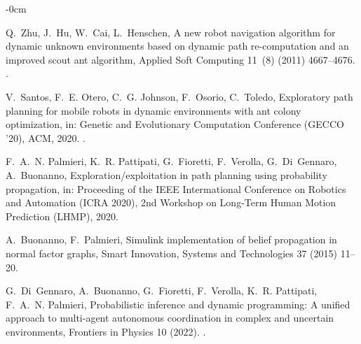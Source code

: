 \documentclass[journal,article,submit,pdftex,moreauthors]{Definitions/mdpi}
\begin{document}
\begin{adjustwidth}{-\extralength}{0cm}
\begin{thebibliography}{10}
	Q.~Zhu, J.~Hu, W.~Cai, L.~Henschen, A new robot navigation algorithm for
	  dynamic unknown environments based on dynamic path re-computation and an
	  improved scout ant algorithm, Applied Soft Computing 11~(8) (2011)
	  4667--4676.
	\newblock \href {https://doi.org/https://doi.org/10.1016/j.asoc.2011.07.016}
	  {}.
	
	V.~Santos, F.~E. Otero, C.~G. Johnson, F.~Osorio, C.~Toledo, Exploratory path
	  planning for mobile robots in dynamic environments with ant colony
	  optimization, in: Genetic and Evolutionary Computation Conference (GECCO
	  '20), ACM, 2020.
	\newblock \href {https://doi.org/https://doi.org/10.1145/3377930.3390219}
	  {}.
	
	F.~A.~N. Palmieri, K.~R. Pattipati, G.~Fioretti, F.~Verolla, G.~Di~Gennaro,
	  A.~Buonanno, Exploration/exploitation in path planning using probability
	  propagation, in: Proceeding of the IEEE Intermational Conference on Robotics
	  and Automation (ICRA 2020), 2nd Workshop on Long-Term Human Motion Prediction
	  (LHMP), 2020.
	
	A.~Buonanno, F.~Palmieri, Simulink implementation of belief propagation in
	  normal factor graphs, Smart Innovation, Systems and Technologies 37 (2015)
	  11--20.
	
	G.~Di~Gennaro, A.~Buonanno, G.~Fioretti, F.~Verolla, K.~R. Pattipati, F.~A.~N.
	  Palmieri, Probabilistic inference and dynamic programming: A unified approach
	  to multi-agent autonomous coordination in complex and uncertain environments,
	  Frontiers in Physics 10 (2022).
	\newblock \href {https://doi.org/10.3389/fphy.2022.944157}
	  {}.
	
	\end{thebibliography}
	


%


\end{adjustwidth}
\end{document}

